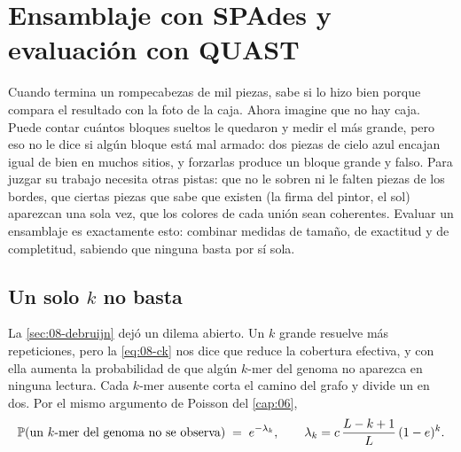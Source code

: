 \section{Ensamblaje con SPAdes y evaluación con QUAST}\label{sec:08-spades}

\begin{intuicion}
Cuando termina un rompecabezas de mil piezas, sabe si lo hizo bien porque compara el resultado con la foto de la caja. Ahora imagine que no hay caja. Puede contar cuántos bloques sueltos le quedaron y medir el más grande, pero eso no le dice si algún bloque está mal armado: dos piezas de cielo azul encajan igual de bien en muchos sitios, y forzarlas produce un bloque grande y falso. Para juzgar su trabajo necesita otras pistas: que no le sobren ni le falten piezas de los bordes, que ciertas piezas que sabe que existen (la firma del pintor, el sol) aparezcan una sola vez, que los colores de cada unión sean coherentes. Evaluar un ensamblaje es exactamente esto: combinar medidas de tamaño, de exactitud y de completitud, sabiendo que ninguna basta por sí sola.
\end{intuicion}

\subsection{Un solo \texorpdfstring{$k$}{k} no basta}

La \cref{sec:08-debruijn} dejó un dilema abierto. Un $k$ grande resuelve más repeticiones, pero la \cref{eq:08-ck} nos dice que reduce la cobertura efectiva, y con ella aumenta la probabilidad de que algún $k$-mer del genoma no aparezca en ninguna lectura. Cada $k$-mer ausente corta el camino del grafo y divide un  en dos. Por el mismo argumento de Poisson del \cref{cap:06},
\begin{equation}\label{eq:08-ausentes}
\mathbb{P}(\text{un $k$-mer del genoma no se observa}) \;=\; e^{-\lambda_k},
\qquad
\lambda_k = c\,\frac{L-k+1}{L}\,(1-e)^k .
\end{equation}

\begin{simbolos}
\end{simbolos}

